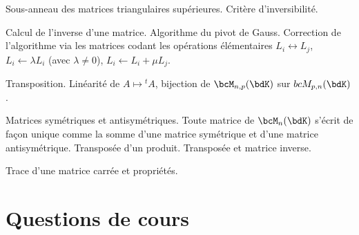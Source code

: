 \documentclass[a4paper,french,bookmarks]{article}
\begin{document}
\begin{enumerate}
\begin{enumerate}
        \itstar Sous-anneau des matrices triangulaires supérieures. Critère d’inversibilité.
    \end{enumerate}
    
    \ithand Calcul de l’inverse d’une matrice. Algorithme du pivot de Gauss. Correction de l’algorithme via les matrices codant les opérations élémentaires $L_i \longleftrightarrow L_j$, $L_i \longleftarrow \lambda L_i$ (avec $\lambda \neq 0$), $L_i \longleftarrow L_i + \mu L_j$.
    
    \ithand Transposition. Linéarité de $A \mapsto {}^t A$, bijection de $\bcM_{n,p}(\bdK)$ sur $\\bcM_{p,n}(\bdK)$.
    
    Matrices symétriques et antisymétriques. Toute matrice de $\bcM_n(\bdK)$ s’écrit de façon unique comme la somme d’une matrice symétrique et d’une matrice antisymétrique. Transposée d’un produit. Transposée et matrice inverse.
    
    \ithand Trace d’une matrice carrée et propriétés.

\end{enumerate}

\section*{Questions de cours}
\end{document}
